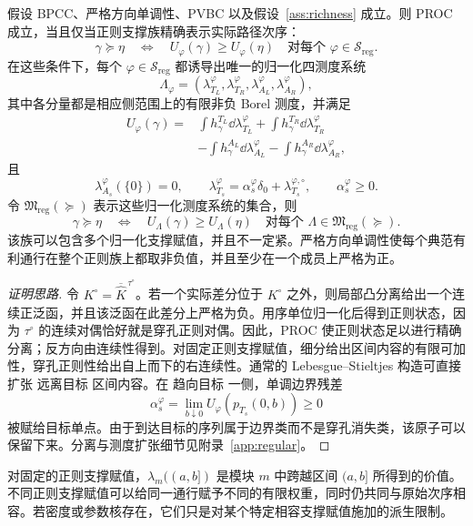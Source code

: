 \begin{theorem}[带目标达成的正则有向测度表示]\label{thm:B}
假设 BPCC、严格方向单调性、PVBC 以及假设~\ref{ass:richness} 成立。则 PROC 成立，当且仅当正则支撑族精确表示实际路径次序：
\[
 \gamma\succeq\eta
 \quad\Longleftrightarrow\quad
 U_\varphi(\gamma)\ge U_\varphi(\eta)
 \quad\text{对每个 }\varphi\in\mathcal S_{\mathrm{reg}}.
\]
在这些条件下，每个 $\varphi\in\mathcal S_{\mathrm{reg}}$ 都诱导出唯一的归一化四测度系统
\[
 \Lambda_\varphi=(\lambda_{T_L}^\varphi,\lambda_{T_R}^\varphi,
                   \lambda_{A_L}^\varphi,\lambda_{A_R}^\varphi),
\]
其中各分量都是相应侧范围上的有限非负 Borel 测度，并满足
\[
\begin{aligned}
 U_\varphi(\gamma)
 ={}&\int h^{T_L}_\gamma\dd\lambda_{T_L}^\varphi
   +\int h^{T_R}_\gamma\dd\lambda_{T_R}^\varphi\\
  &-\int h^{A_L}_\gamma\dd\lambda_{A_L}^\varphi
   -\int h^{A_R}_\gamma\dd\lambda_{A_R}^\varphi,
\end{aligned}
\]
且
\[
 \lambda_{A_s}^\varphi(\{0\})=0,
 \qquad
 \lambda_{T_s}^\varphi=\alpha_s^\varphi\delta_0+\lambda_{T_s}^{\varphi,\circ},
 \qquad
 \alpha_s^\varphi\ge0.
\]
令 $\mathfrak M_{\mathrm{reg}}(\succeq)$ 表示这些归一化测度系统的集合，则
\[
 \gamma\succeq\eta
 \quad\Longleftrightarrow\quad
 U_\Lambda(\gamma)\ge U_\Lambda(\eta)
 \quad\text{对每个 }\Lambda\in\mathfrak M_{\mathrm{reg}}(\succeq).
\]
该族可以包含多个归一化支撑赋值，并且不一定紧。严格方向单调性使每个典范有利通行在整个正则族上都取非负值，并且至少在一个成员上严格为正。
\end{theorem}

\begin{proof}[证明思路]
令 $K^\circ=\overline{\widehat K}^{\,\tau^\circ}$。若一个实际差分位于 $K^\circ$ 之外，则局部凸分离给出一个连续正泛函，并且该泛函在此差分上严格为负。用序单位归一化后得到正则状态，因为 $\tau^\circ$ 的连续对偶恰好就是穿孔正则对偶。因此，PROC 使正则状态足以进行精确分离；反方向由连续性得到。对固定正则支撑赋值，细分给出区间内容的有限可加性，穿孔正则性给出自上而下的右连续性。通常的 Lebesgue--Stieltjes 构造可直接扩张 远离目标 区间内容。在 趋向目标 一侧，单调边界残差
\[
 \alpha_s^\varphi=\lim_{b\downarrow0}U_\varphi(p_{T_s}(0,b))\ge0
\]
被赋给目标单点。由于到达目标的序列属于边界类而不是穿孔消失类，该原子可以保留下来。分离与测度扩张细节见附录~\ref{app:regular}。
\end{proof}

对固定的正则支撑赋值，$\lambda_m((a,b])$ 是模块 $m$ 中跨越区间 $(a,b]$ 所得到的价值。不同正则支撑赋值可以给同一通行赋予不同的有限权重，同时仍共同与原始次序相容。若密度或参数核存在，它们只是对某个特定相容支撑赋值施加的派生限制。

